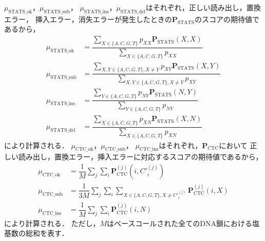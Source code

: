 \documentclass[sotsuron]{kuee}
\begin{document}
$\mu_{\mathrm{STATS}\_\mathrm{ok}}$，$\mu_{\mathrm{STATS}\_\mathrm{sub}}$，
$\mu_{\mathrm{STATS}\_\mathrm{ins}}$，$\mu_{\mathrm{STATS}\_\mathrm{del}}$はそれぞれ，正しい読み出し，置換エラー，
挿入エラー，消失エラーが発生したときの$\bm{P}_{\mathrm{STATS}}$のスコアの期待値であるから，
\begin{align}
  \mu_{\mathrm{STATS}\_\mathrm{ok}} &= \dfrac{\displaystyle \sum_{X \in \{A,C,G,T\}} p_{XX} \bm{P}_{\mathrm{STATS}}(X,X)}{\displaystyle \sum_{X \in \{A,C,G,T\}} p_{XX}} \\
  \mu_{\mathrm{STATS}\_\mathrm{sub}} &= \dfrac{\displaystyle \sum_{X,Y \in \{A,C,G,T\}, X \neq Y} p_{XY} \bm{P}_{\mathrm{STATS}}(X,Y)}{\displaystyle \sum_{X,Y \in \{A,C,G,T\}, X \neq Y} p_{XY}} \\
  \mu_{\mathrm{STATS}\_\mathrm{ins}} &= \dfrac{\displaystyle \sum_{Y \in \{A,C,G,T\}} p_{NY} \bm{P}_{\mathrm{STATS}}(N,Y)}{\displaystyle \sum_{Y \in \{A,C,G,T\}} p_{NY}} \\
  \mu_{\mathrm{STATS}\_\mathrm{del}} &= \dfrac{\displaystyle \sum_{X \in \{A,C,G,T\}} p_{XN} \bm{P}_{\mathrm{STATS}}(X,N)}{\displaystyle \sum_{X \in \{A,C,G,T\}} p_{XN}}
\end{align}
により計算される．
$\mu_{\mathrm{CTC}\_\mathrm{ok}}$，$\mu_{\mathrm{CTC}\_\mathrm{sub}}$，
$\mu_{\mathrm{CTC}\_\mathrm{ins}}$はそれぞれ，$\bm{P}_{\mathrm{CTC}}$において
正しい読み出し，置換エラー，挿入エラーに対応するスコアの期待値であるから，
\begin{align}
  \mu_{\mathrm{CTC}\_\mathrm{ok}} &= \dfrac{1}{M}\sum_j \sum_i \bm{P}_{\mathrm{CTC}}^{(j)}(i, C'^{(j)}_i) \\
  \mu_{\mathrm{CTC}\_\mathrm{sub}} &= \dfrac{1}{3M}\sum_j \sum_i \sum_{X \in \{A,C,G,T\}, X \neq C'^{(j)}_i} \bm{P}_{\mathrm{CTC}}^{(j)}(i, X) \\
  \mu_{\mathrm{CTC}\_\mathrm{ins}} &= \dfrac{1}{M}\sum_j \sum_i \bm{P}_{\mathrm{CTC}}^{(j)}(i, N)
\end{align}
により計算される．
ただし，$M$はベースコールされた全てのDNA鎖における塩基数の総和を表す．
\end{document}
